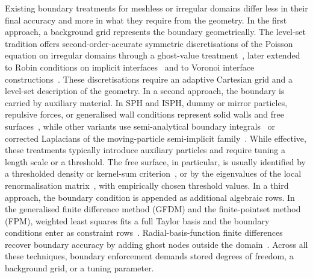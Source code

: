 \documentclass[preprint,review,12pt]{elsarticle}
\begin{document}
Existing boundary treatments for meshless or irregular domains differ less in their final accuracy and more in what they require from the geometry.
In the first approach, a background grid represents the boundary geometrically.
The level-set tradition offers second-order-accurate symmetric discretisations of the Poisson equation on irregular domains through a ghost-value treatment~\cite{Gibou2002,MinGibou2007,GibouMin2012,Mirzadeh2016}, later extended to Robin conditions on implicit interfaces~\cite{Papac2013} and to Voronoi interface constructions~\cite{Guittet2015}.
These discretisations require an adaptive Cartesian grid and a level-set description of the geometry.
In a second approach, the boundary is carried by auxiliary material.
In SPH and ISPH, dummy or mirror particles, repulsive forces, or generalised wall conditions represent solid walls and free surfaces~\cite{Adami2012,Colagrossi2003,Marrone2011}, while other variants use semi-analytical boundary integrals~\cite{Ferrand2013,Leroy2014,Macia2012} or corrected Laplacians of the moving-particle semi-implicit family~\cite{Koshizuka1998,Ikari2015,Huang2016,Tamai2017,Ma2016}.
While effective, these treatments typically introduce auxiliary particles and require tuning a length scale or a threshold.
The free surface, in particular, is usually identified by a thresholded density or kernel-sum criterion~\cite{Doring2005,Lee2008}, or by the eigenvalues of the local renormalisation matrix~\cite{Marrone2010}, with empirically chosen threshold values.
In a third approach, the boundary condition is appended as additional algebraic rows.
In the generalised finite difference method (GFDM) and the finite-pointset method (FPM), weighted least squares fits a full Taylor basis and the boundary conditions enter as constraint rows~\cite{Benito2001,Kuhnert2001,Tiwari2003,Suchde2018,Trask2017}.
Radial-basis-function finite differences recover boundary accuracy by adding ghost nodes outside the domain~\cite{Bayona2010,Fedoseyev2002,Dobravec2024}.
Across all these techniques, boundary enforcement demands stored degrees of freedom, a background grid, or a tuning parameter.
\end{document}
